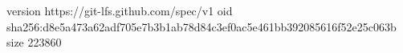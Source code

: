 version https://git-lfs.github.com/spec/v1
oid sha256:d8e5a473a62adf705e7b3b1ab78d84c3ef0ac5e461bb392085616f52e25c063b
size 223860
